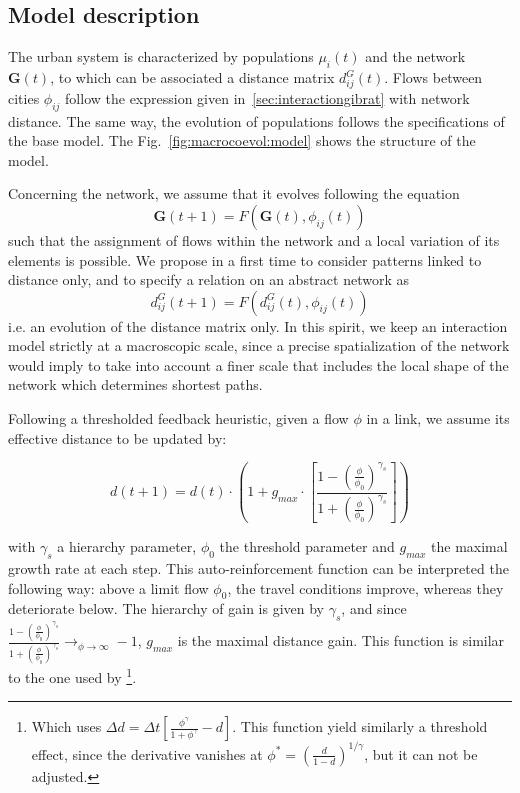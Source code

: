 \subsection{Model description}

The urban system is characterized by populations $\mu_i(t)$ and the network $\mathbf{G}(t)$, to which can be associated a distance matrix $d^G_{ij}(t)$. Flows between cities $\phi_{ij}$ follow the expression given in~\ref{sec:interactiongibrat} with network distance. The same way, the evolution of populations follows the specifications of the base model. The Fig.~\ref{fig:macrocoevol:model} shows the structure of the model.


Concerning the network, we assume that it evolves following the equation
\begin{equation}
\mathbf{G}(t + 1) = F(\mathbf{G}(t),\phi_{ij}(t))
\end{equation}
such that the assignment of flows within the network and a local variation of its elements is possible. We propose in a first time to consider patterns linked to distance only, and to specify a relation on an abstract network as
\begin{equation}
d^G_{ij}(t+1) = F(d^G_{ij}(t),\phi_{ij}(t))
\end{equation}
i.e. an evolution of the distance matrix only. In this spirit, we keep an interaction model strictly at a macroscopic scale, since a precise spatialization of the network would imply to take into account a finer scale that includes the local shape of the network which determines shortest paths.



Following a thresholded feedback heuristic, given a flow $\phi$ in a link, we assume its effective distance to be updated by:

\begin{equation}
d(t+1) = d(t)\cdot \left( 1 + g_{max} \cdot \left[\frac{1 - \left(\frac{\phi}{\phi_0}\right)^{\gamma_s}}{1 + \left(\frac{\phi}{\phi_0}\right)^{\gamma_s}}\right]\right)
\end{equation}

with $\gamma_s$ a hierarchy parameter, $\phi_0$ the threshold parameter and $g_{max}$ the maximal growth rate at each step. This auto-reinforcement function can be interpreted the following way: above a limit flow $\phi_0$, the travel conditions improve, whereas they deteriorate below. The hierarchy of gain is given by $\gamma_s$, and since $\frac{1 - \left(\frac{\phi}{\phi_0}\right)^{\gamma_s}}{1 + \left(\frac{\phi}{\phi_0}\right)^{\gamma_s}} \rightarrow_{\phi\rightarrow \infty} -1$, $g_{max}$ is the maximal distance gain. This function is similar to the one used by \cite{tero2007mathematical}\footnote{Which uses $\Delta d = \Delta t \left[ \frac{\phi^\gamma}{1 + \phi^\gamma} - d\right]$. This function yield similarly a threshold effect, since the derivative vanishes at $\phi^{\ast} = \left(\frac{d}{1 - d}\right)^{1/\gamma}$, but it can not be adjusted.}.



